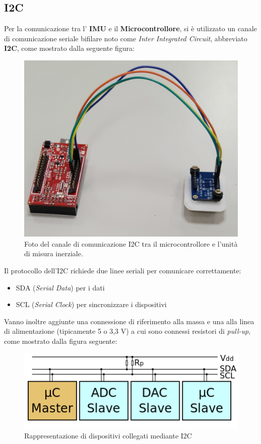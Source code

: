 \subsection{I2C}
\label{imp_i2c}
Per la comunicazione tra l' \textbf{IMU} e il \textbf{Microcontrollore}, si è utilizzato un canale di comunicazione seriale bifilare noto come \textit{Inter Integrated Circuit}, abbreviato \textbf{I2C}, come mostrato dalla seguente figura:
\begin{figure}[H]  
	\centering 
	\includegraphics[scale=0.1]{implementazione/i2cFoto.jpg}
	\caption{Foto del canale di comunicazione I2C tra il microcontrollore e l'unità di misura inerziale.}
	\label{fig:i2cFoto}
\end{figure}
Il protocollo \cite{i2cWiki} dell'I2C richiede due linee seriali per comunicare correttamente:
\begin{itemize}
\item SDA (\textit{Serial Data}) per i dati
\item SCL (\textit{Serial Clock}) per sincronizzare i dispositivi
\end{itemize}
Vanno inoltre aggiunte una connessione di riferimento alla massa e una alla linea di alimentazione (tipicamente 5 o 3,3 V) a cui sono connessi resistori di \textit{pull-up}, come mostrato dalla figura seguente:
\begin{figure}[H]  
	\centering 
	\includegraphics[scale=0.6]{implementazione/i2c.png}
	\caption{Rappresentazione di dispositivi collegati mediante I2C}
	\label{fig:i2c}
\end{figure}
